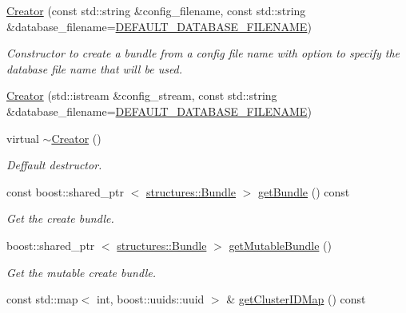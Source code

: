 \begin{DoxyCompactItemize}
\item 
\hyperlink{classcryomesh_1_1manager_1_1Creator_a4881650c49a273648a9bccddb9a832fc}{\-Creator} (const std\-::string \&config\-\_\-filename, const std\-::string \&database\-\_\-filename=\hyperlink{classcryomesh_1_1manager_1_1Creator_a36ec491bb68e6a595086c239af7bd989}{\-D\-E\-F\-A\-U\-L\-T\-\_\-\-D\-A\-T\-A\-B\-A\-S\-E\-\_\-\-F\-I\-L\-E\-N\-A\-M\-E})
\begin{DoxyCompactList}\small\item\em \-Constructor to create a bundle from a config file name with option to specify the database file name that will be used. \end{DoxyCompactList}\item 
\hyperlink{classcryomesh_1_1manager_1_1Creator_a6479ea01aa020c99899198f08ef558b6}{\-Creator} (std\-::istream \&config\-\_\-stream, const std\-::string \&database\-\_\-filename=\hyperlink{classcryomesh_1_1manager_1_1Creator_a36ec491bb68e6a595086c239af7bd989}{\-D\-E\-F\-A\-U\-L\-T\-\_\-\-D\-A\-T\-A\-B\-A\-S\-E\-\_\-\-F\-I\-L\-E\-N\-A\-M\-E})
\item 
virtual \hyperlink{classcryomesh_1_1manager_1_1Creator_a8eea37df1f5fc6c94a97c42ce4d9a5d0}{$\sim$\-Creator} ()
\begin{DoxyCompactList}\small\item\em \-Deffault destructor. \end{DoxyCompactList}\item 
const boost\-::shared\-\_\-ptr\*
$<$ \hyperlink{classcryomesh_1_1structures_1_1Bundle}{structures\-::\-Bundle} $>$ \hyperlink{classcryomesh_1_1manager_1_1Creator_a10d07b373f504e7a479acb16abacb713}{get\-Bundle} () const 
\begin{DoxyCompactList}\small\item\em \-Get the create bundle. \end{DoxyCompactList}\item 
boost\-::shared\-\_\-ptr\*
$<$ \hyperlink{classcryomesh_1_1structures_1_1Bundle}{structures\-::\-Bundle} $>$ \hyperlink{classcryomesh_1_1manager_1_1Creator_a2155dae515aa5d360a577ef82437f338}{get\-Mutable\-Bundle} ()
\begin{DoxyCompactList}\small\item\em \-Get the mutable create bundle. \end{DoxyCompactList}\item 
const std\-::map$<$ int, \*
boost\-::uuids\-::uuid $>$ \& \hyperlink{classcryomesh_1_1manager_1_1Creator_adf060224477ba4086f7e4aab30b60cf6}{get\-Cluster\-I\-D\-Map} () const 

\end{DoxyCompactItemize}
